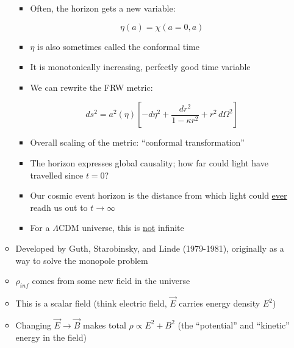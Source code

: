 \begin{itemize}
\begin{itemize}
\begin{itemize}
          \item Often, the horizon gets a new variable:

            $$\eta(a)=\chi(a=0,a)$$

          \item $\eta$ is also sometimes called the conformal time

          \item It is monotonically increasing, perfectly good time variable

          \item We can rewrite the FRW metric:

            $$ds^2=a^2(\eta)\left[-d\eta^2+\frac{dr^2}{1-\kappa r^2}+r^2\,d\Omega^2\right]$$

          \item Overall scaling of the metric: ``conformal transformation''

          \item The horizon expresses global causality; how far could light have travelled since $t=0$?

          \item Our cosmic event horizon is the distance from which light could \underline{ever} readh us out to $t\to\infty$

          \item For a $\Lambda$CDM universe, this is \underline{not} infinite

        \end{itemize}

      \item Developed by Guth, Starobinsky, and Linde (1979-1981), originally as a way to solve the monopole problem

      \item $\rho_{inf}$ comes from some new field in the universe

      \item This is a scalar field (think electric field, $\vec{E}$ carries energy density $E^2$)

      \item Changing $\vec{E}\to\vec{B}$ makes total $\rho\propto E^2+B^2$ (the ``potential'' and ``kinetic'' energy in the field)

    \end{itemize}

\end{itemize}




